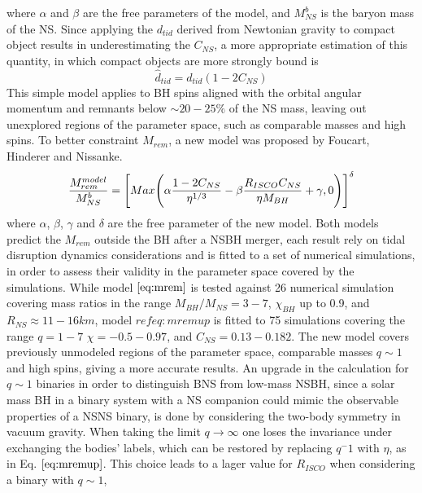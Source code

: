 \documentclass[binding=0.6cm, LaM]{sapthesis}
\begin{document}
        where $\alpha$ and $\beta$ are the free parameters of the model,
        and $M^b_{NS}$ is the baryon mass of the NS.
        Since applying the $d_{tid}$ derived from Newtonian gravity to compact object results in underestimating the $C_{NS}$,
        a more appropriate estimation of this quantity, in which compact objects are more strongly bound is
                \begin{equation}
                \label{eq:mreup} 
		       \hat{d}_{tid} = d_{tid} (1 - 2C_{NS})
                \end{equation}
        This simple model applies to BH spins aligned with the orbital angular momentum and remnants below
        $\sim 20-25\%$ of the NS mass, leaving out unexplored regions of the parameter space,
        such as comparable masses and high spins.
        To better constraint $M_{rem}$, a new model was proposed by Foucart, Hinderer and Nissanke.
                \begin{equation}
                        {{M_{rem}^{model}} \over {M^b_{NS}}} = \Bigg[ Max \Bigg( \alpha{{1 - 2C_{NS}} \over {\eta^{1/3}}} - \beta {{R_{ISCO}C_{NS}} \over{\eta M_{BH}}} + \gamma, 0 \Bigg)\Bigg]^{\delta}
                \end{equation}
	where $\alpha$, $\beta$, $\gamma$ and $\delta$ are the free parameter of the new model.
	Both models predict the $M_{rem}$ outside the BH after a NSBH merger, 
	each result rely on tidal disruption dynamics considerations and 
	is fitted to a set of numerical simulations, 
	in order to assess their validity in the parameter space covered by the simulations.
	While model $\ref{eq:mrem}$ is tested against 26 numerical simulation covering mass ratios 
	in the range $M_{BH}/M_{NS}=3-7$, $\chi_{BH}$ up to 0.9, and $R_{NS} \approx 11-16 km$,  
	model $ref{eq:mremup}$ is fitted to 75 simulations covering the range $q = 1-7$ $\chi =-0.5-0.97$, 
	and $C_{NS} = 0.13-0.182$.
	The new model covers previously unmodeled regions of the parameter space, comparable masses $q \sim 1$ and high spins,
	giving a more accurate  results.
	An upgrade in the calculation for $q \sim 1$ binaries in order to distinguish BNS from low-mass NSBH, 
	since a solar mass BH in a binary system with a NS companion could mimic the observable properties of a NSNS binary,
	is done by considering the two-body symmetry in vacuum gravity. 
	When taking the limit $q \rightarrow \infty$ one loses the invariance under exchanging the bodies' labels, 
	which can be restored by replacing $q^-1$ with $\eta$, as in Eq. $\ref{eq:mremup}$.
	This choice leads to a lager value for $R_{ISCO}$ when considering a binary with $q \sim 1$, 
\end{document}
